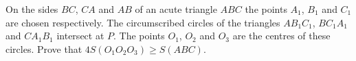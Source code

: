 \problem
On the sides $BC$, $CA$ and $AB$ of an acute triangle $ABC$ the points 
$A_1$, $B_1$ and $C_1$ are chosen respectively. The circumscribed circles of the triangles
$AB_1C_1$, $BC_1A_1$ and $CA_1B_1$ intersect at $P$. The points
$O_1$, $O_2$ and $O_3$ are the centres of these circles. Prove that
$4S(O_1O_2O_3)\geq S(ABC)$.
\solution
\endproblem
